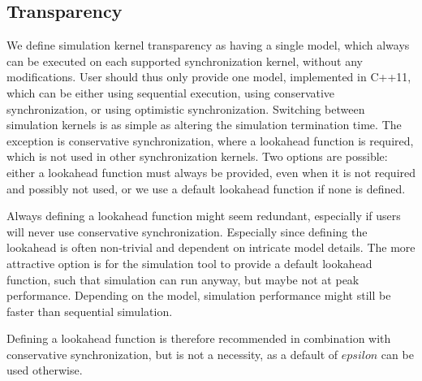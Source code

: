 \subsection{Transparency}
We define simulation kernel transparency as having a single model, which always can be executed on each supported synchronization kernel, without any modifications.
User should thus only provide one model, implemented in C++11, which can be either using sequential execution, using conservative synchronization, or using optimistic synchronization.
Switching between simulation kernels is as simple as altering the simulation termination time.
The exception is conservative synchronization, where a lookahead function is required, which is not used in other synchronization kernels.
Two options are possible: either a lookahead function must always be provided, even when it is not required and possibly not used, or we use a default lookahead function if none is defined.

Always defining a lookahead function might seem redundant, especially if users will never use conservative synchronization.
Especially since defining the lookahead is often non-trivial and dependent on intricate model details.
The more attractive option is for the simulation tool to provide a default lookahead function, such that simulation can run anyway, but maybe not at peak performance.
Depending on the model, simulation performance might still be faster than sequential simulation. 

Defining a lookahead function is therefore recommended in combination with conservative synchronization, but is not a necessity, as a default of $epsilon$ can be used otherwise.
